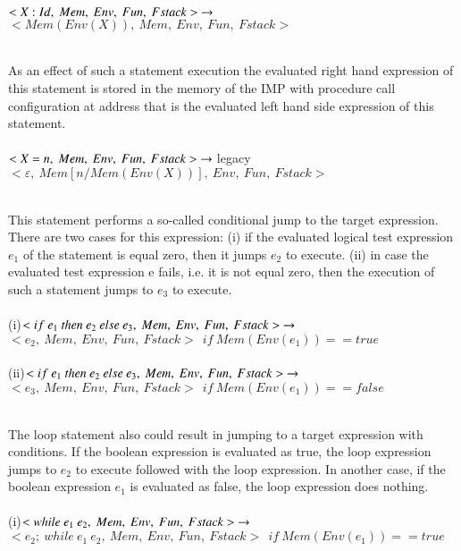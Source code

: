 \documentclass[conference]{IEEEtran}
\begin{document}
$<X:Id,~Mem,~Env,~Fun,~Fstack>~\rightarrow\\ \\$
$<Mem(Env(X)),~Mem,~Env,~Fun,~Fstack>$\\ \\
\par As an effect of such a statement execution the evaluated right hand
expression of this statement is stored in the memory of the IMP with procedure call configuration at
address that is the evaluated left hand side expression of this statement. \\ \\
$<X=n,~Mem,~Env,~Fun,~Fstack>~\rightarrow\\ \\$legacy
$<\varepsilon,~Mem[n/Mem(Env(X))],~Env,~Fun,~Fstack>$\\ \\
\par This statement performs a so-called conditional jump to the target expression. There are two cases for this expression: (i) if the evaluated logical test expression $e_1$
of the statement is equal zero, then it jumps $e_2$ to execute. (ii) in case the evaluated test expression e fails, i.e. it is not equal zero, then the
execution of such a statement jumps to $e_3$ to execute.\\ \\
(i)$<if~e_1~then~e_2~else~e_3,~Mem,~Env,~Fun,~Fstack>~\rightarrow\\ \\$
$<e_2,~Mem,~Env,~Fun,~Fstack>~~if~Mem(Env(e_1))==true$\\ \\
(ii)$<if~e_1~then~e_2~else~e_3,~Mem,~Env,~Fun,~Fstack>~\rightarrow\\ \\$
$<e_3,~Mem,~Env,~Fun,~Fstack>~~if~Mem(Env(e_1))==false$\\ \\
\par The loop statement also could result in jumping to a target expression with conditions. If the boolean expression is evaluated as true, the loop expression jumps to $e_2$ to execute followed with the loop expression. In another case, if the boolean expression $e_1$ is evaluated as false, the loop expression does nothing.\\ \\
(i)$<while~e_1~e_2,~Mem,~Env,~Fun,~Fstack>~\rightarrow\\ \\$
$<e_2;~while~e_1~e_2,~Mem,~Env,~Fun,~Fstack>~~if~Mem(Env(e_1))==true$\\ \\
\end{document}
